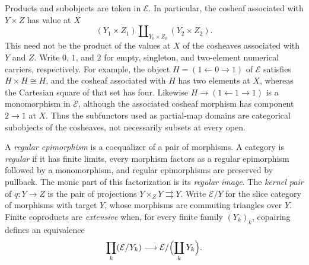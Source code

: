 Products and subobjects are taken in $\mathcal E$. In
particular, the cosheaf associated with $Y\times Z$ has value at $X$
\[
 (Y_1\times Z_1)\amalg_{Y_0\times Z_0}(Y_2\times Z_2).
\]
This need not be the product of the values at $X$ of
the cosheaves associated with $Y$ and $Z$. Write $0$, $1$, and $2$
for empty, singleton, and two-element numerical carriers, respectively.
For example,
the object $H=(1\leftarrow0\to1)$ of $\mathcal E$ satisfies
$H\times H\cong H$,
and the cosheaf associated with $H$ has two elements at $X$,
whereas the Cartesian square of that set has four.
Likewise $H\to(1\leftarrow1\to1)$ is a monomorphism in $\mathcal E$,
although the associated cosheaf morphism has component $2\to1$ at $X$.
Thus the
subfunctors used as partial-map domains are categorical subobjects
of the cosheaves, not necessarily subsets at every open.

A \emph{regular epimorphism} is a coequalizer of a pair of morphisms.
A category is \emph{regular} if it has finite limits, every morphism
factors as a regular epimorphism followed by a monomorphism, and
regular epimorphisms are preserved by pullback. The monic part of
this factorization is its \emph{regular image}. The \emph{kernel
pair} of $q:Y\to Z$ is the pair of projections
$Y\times_ZY\rightrightarrows Y$.
Write $\mathcal E/Y$ for the slice category of morphisms with target $Y$,
whose morphisms are commuting triangles over $Y$.
Finite coproducts are \emph{extensive} when, for every finite family
$(Y_k)_k$, copairing defines an equivalence
\[
 \prod_k(\mathcal E/Y_k)\longrightarrow
 \mathcal E/\Bigl(\coprod_kY_k\Bigr).
\]

